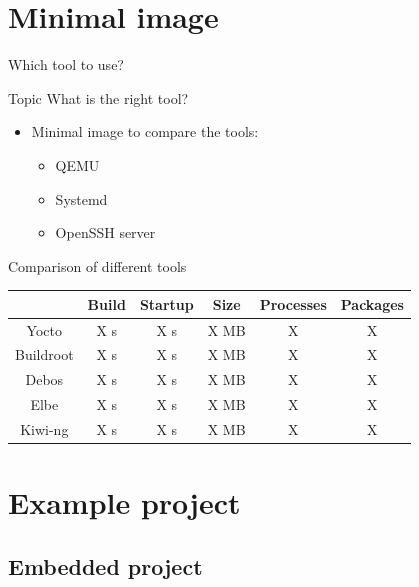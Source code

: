 \documentclass{beamer}
\begin{document}
\section{Minimal image}

\begin{frame}{Which tool to use?}
	\begin{block}{Topic}
		What is the right tool?
	\end{block}

	\begin{itemize}
		\item Minimal image to compare the tools:
		\begin{itemize}
			\item QEMU
			\item Systemd 
			\item OpenSSH server
		\end{itemize}
	\end{itemize}
\end{frame}

\begin{frame}{Comparison of different tools}
	\begin{tabular}{c|ccccc}
		& \textbf{Build} & \textbf{Startup} & \textbf{Size} & \textbf{Processes} & \textbf{Packages} \\
		\hline
		Yocto & X s & X s & X MB & X & X \\ 
		Buildroot & X s & X s & X MB & X & X \\
		\hline
		Debos & X s & X s & X MB & X & X \\
		Elbe & X s & X s & X MB & X & X \\
		Kiwi-ng & X s & X s & X MB & X & X \\
	\end{tabular}
\end{frame}


\section{Example project}

\subsection{Embedded project}

\end{document}
